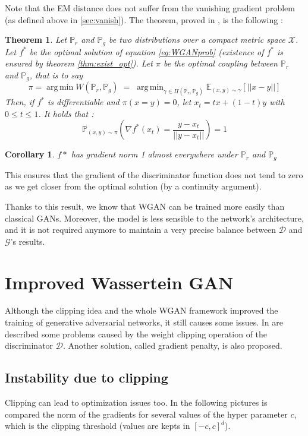 \documentclass[a4paper]{article}
\newcommand{\G}{\mathcal{G}}
\newcommand{\D}{\mathcal{D}}
\newcommand{\X}{\mathcal{X}}
\newcommand{\Expec}{\mathbb{E}}
\newcommand{\Prob}{\mathbb{P}}
\DeclareMathOperator*{\argmin}{arg\,min}
\theoremstyle{plain}
\newtheorem{thm}{Theorem}
\newtheorem{corol}{Corollary}
\theoremstyle{remark}
\theoremstyle{definition}
\begin{document}
Note that the EM distance does not suffer from the vanishing gradient problem (as defined above in \ref{sec:vanish}). The theorem, proved in \cite{gulrajani2017improved}, is the following :

\begin{thm}
\label{thm:norm1}
Let $\Prob_r$ and $\Prob_g$ be two distributions over a compact metric space $\X$. Let $f^*$ be the optimal solution of equation \ref{eq:WGANprob} (existence of $f^*$ is ensured by theorem \ref{thm:exist_opt}). Let $\pi$ be the optimal coupling between $\Prob_r$ and $\Prob_g$, that is to say $$\pi = \argmin W(\Prob_r, \Prob_g) \;=\; \argmin_{\gamma \in \Pi(\Prob_r,\Prob_g)} \Expec_{(x,y) \sim \gamma}[ ||x-y|| ]$$ Then, if $f^*$ is differentiable and $\pi (x = y) = 0$, 
let $x_t = tx + (1-t)y$ with $0 \leqslant t \leqslant 1$. It holds that :
$$ \Prob_{(x,y) \sim \pi} \left( \nabla f^*(x_t) = \frac{y - x_t}{||y - x_t ||} \right) = 1 $$
\end{thm}
\begin{corol}
$f*$ has gradient norm 1 almost everywhere under $\Prob_r$ and $\Prob_g$
\end{corol}

This ensures that the gradient of the discriminator function does not tend to zero as we get closer from the optimal solution (by a continuity argument).

Thanks to this result, we know that WGAN can be trained more easily than classical GANs. Moreover, the model is less sensible to the network's architecture, and it is not required anymore to maintain a very precise balance between $\D$ and $\G$'s results.

\section{Improved Wassertein GAN}

Although the clipping idea and the whole WGAN framework improved the training of generative adversarial networks, it still causes some issues. In \cite{gulrajani2017improved} are described some problems caused by the weight clipping operation of the discriminator $\D$. Another solution, called gradient penalty, is also proposed.

\subsection{Instability due to clipping}

Clipping can lead to optimization issues too. In the following pictures is compared the norm of the gradients for several values of the hyper parameter $c$, which is the clipping threshold (values are kepts in $[-c,c]^d$).
\end{document}

